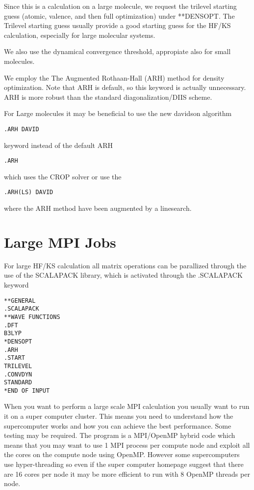 Since this is a calculation on a large molecule, we request the trilevel starting 
guess\cite{trilevel1, trilevel2} (atomic, valence, and then full optimization) under **DENSOPT. 
The Trilevel starting guess usually provide a good starting guess 
for the HF/KS calculation, especially for large molecular systems. 
 
We also use the dynamical convergence threshold, appropiate also for small molecules. 

We employ the The Augmented Rothaan-Hall (ARH) method for density optimization. 
Note that ARH is default, so this keyword is actually unnecessary.
ARH is more robust than the standard diagonalization/DIIS scheme.

For Large molecules it may be beneficial to use the new davidson algorithm 

\begin{verbatim}
.ARH DAVID
\end{verbatim}

keyword instead of the default ARH

\begin{verbatim}
.ARH
\end{verbatim}
which uses the CROP solver or use the 
\begin{verbatim}
.ARH(LS) DAVID
\end{verbatim}
where the ARH method have been augmented by a linesearch. 

\section{Large MPI Jobs}

For large HF/KS calculation all matrix operations can be parallized through the use of the SCALAPACK library, which is activated through the .SCALAPACK keyword 

\begin{verbatim}
**GENERAL
.SCALAPACK
**WAVE FUNCTIONS
.DFT
B3LYP
*DENSOPT
.ARH
.START
TRILEVEL
.CONVDYN
STANDARD
*END OF INPUT
\end{verbatim}

When you want to perform a large scale MPI calculation you usually want to run it on a super computer cluster. This means you need to understand how the supercomputer works and how you can achieve the best performance. Some testing may be required. The {\lsdalton} program is a MPI/OpenMP hybrid code which means that you may want to use 1 MPI process per compute node and exploit all the cores on the compute node using OpenMP. However some supercomputers use hyper-threading so even if the super computer homepage suggest that there are 16 cores per node  it may be more efficient to run with 8 OpenMP threads per node.    

